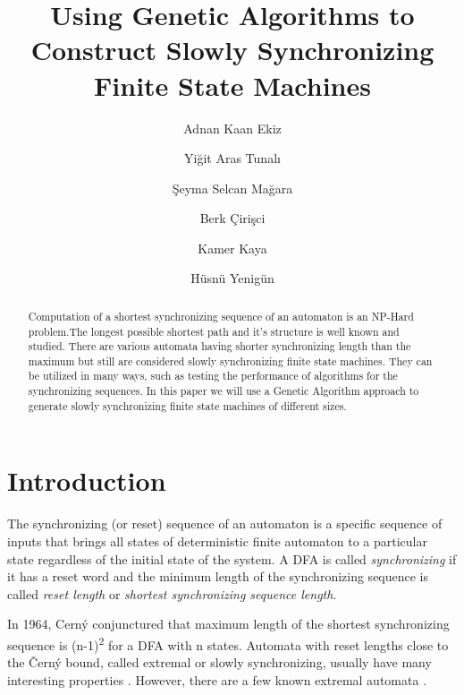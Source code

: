 \documentclass[runningheads]{llncs}
\begin{document}
\title{Using Genetic Algorithms to Construct Slowly Synchronizing Finite State Machines}

\author{Adnan Kaan Ekiz  \and Yi\u{g}it Aras Tunal{\i} \and
\c{S}eyma Selcan Ma\u{g}ara \and Berk \c{C}iri\c{s}ci \and Kamer Kaya \and H\"{u}sn\"{u} Yenig\"{u}n}


\maketitle

\begin{abstract}
Computation of a shortest synchronizing sequence of an automaton is an NP-Hard problem.The longest possible shortest path and it's structure is well known and studied. There are various automata having shorter synchronizing length than the maximum but still are considered slowly synchronizing finite state machines. They can be utilized in many ways, such as testing the performance of algorithms for the synchronizing sequences. In this paper we will use a Genetic Algorithm approach to generate slowly synchronizing finite state machines of different sizes.
\end{abstract}

\section{Introduction}
The synchronizing (or reset) sequence of an automaton is a specific sequence of inputs that brings all states of deterministic finite automaton to a particular state regardless of the initial state of the system. A DFA is called \textit{synchronizing} if it has a reset word and the minimum length of the synchronizing sequence is called \textit{reset length} or \textit{shortest synchronizing sequence length}.\par
In 1964, Cerný \cite{cerny} conjunctured that maximum length of the shortest synchronizing sequence is (n-1)\textsuperscript{2} for a DFA with n states. Automata with reset lengths close to the Černý bound, called extremal or slowly synchronizing, usually have many interesting properties \cite{podolak_roman_szykula_zielinski_2017}. However, there are a few known extremal automata  \cite{Ananichev_Gusev_Volkov_2010}.
\end{document}
